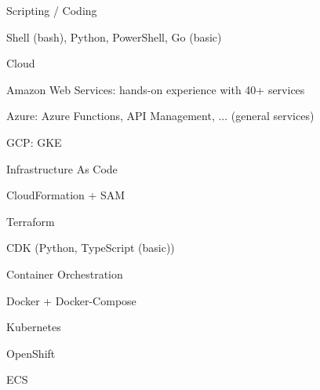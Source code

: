 

\begin{cvskills}

  \cvskill
    {Scripting / Coding} %
    {
      \begin{cvitems} %
        \item {Shell (bash), Python, PowerShell, Go (basic)} %
      \end{cvitems}
    }

  \cvskill
    {Cloud} %
    {
      \begin{cvitems} %
        \item {Amazon Web Services: hands-on experience with 40+ services} %
        \item {Azure: Azure Functions, API Management, ... (general services)} %
        \item {GCP: GKE} %
      \end{cvitems}
    }

  \cvskill
    {Infrastructure As Code} %
    {
      \begin{cvitems} %
        \item {CloudFormation + SAM} %
        \item {Terraform} %
        \item {CDK (Python, TypeScript (basic))} %
      \end{cvitems}
    }

  \cvskill
    {Container Orchestration} %
    {
      \begin{cvitems} %
        \item {Docker + Docker-Compose} %
        \item {Kubernetes} %
        \item {OpenShift} %
        \item {ECS} %
      \end{cvitems}
    }


\end{cvskills}
